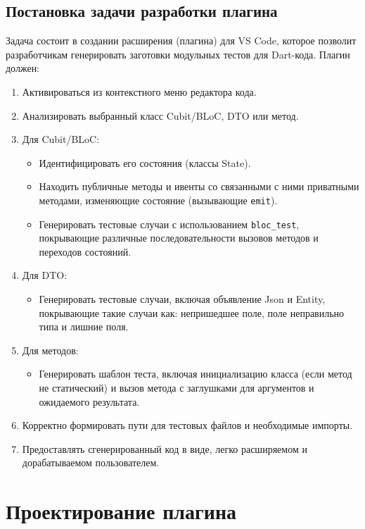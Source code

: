 \documentclass[14pt, russian]{scrartcl}
\begin{document}
\subsection{Постановка задачи разработки плагина}
Задача состоит в создании расширения (плагина) для VS Code, которое позволит разработчикам генерировать заготовки модульных тестов для Dart-кода. Плагин должен:
\begin{enumerate}
    \item Активироваться из контекстного меню редактора кода.
    \item Анализировать выбранный класс Cubit/BLoC, DTO или метод.
    \item Для Cubit/BLoC:
        \begin{itemize}
            \item Идентифицировать его состояния (классы State).
            \item Находить публичные методы и ивенты со связанными с ними приватными методами, изменяющие состояние (вызывающие \texttt{emit}).
            \item Генерировать тестовые случаи с использованием \texttt{bloc\_test}, покрывающие различные последовательности вызовов методов и переходов состояний.
        \end{itemize}
    \item Для DTO:
        \begin{itemize}
            \item Генерировать тестовые случаи, включая объявление Json и Entity, покрывающие такие случаи как: непришедшее поле, поле неправильно типа и лишние поля.
        \end{itemize}
    \item Для методов:
        \begin{itemize}
            \item Генерировать шаблон теста, включая инициализацию класса (если метод не статический) и вызов метода с заглушками для аргументов и ожидаемого результата.
        \end{itemize}
    \item Корректно формировать пути для тестовых файлов и необходимые импорты.
    \item Предоставлять сгенерированный код в виде, легко расширяемом и дорабатываемом пользователем.
\end{enumerate}

\section{Проектирование плагина}
\end{document}
